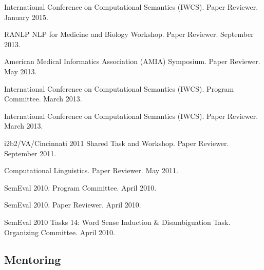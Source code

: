 \documentclass[letterpaper]{article}
\renewenvironment{itemize}{
  \begin{list}{}{
    \setlength{\leftmargin}{1.5em}
  }
}{
  \end{list}
}
\begin{document}
\begin{itemize}
\item International Conference on Computational Semantics (IWCS). Paper Reviewer. January 2015.
\item RANLP NLP for Medicine and Biology Workshop. Paper Reviewer. September 2013.
\item American Medical Informatics Association (AMIA) Symposium. Paper Reviewer. May 2013.
\item International Conference on Computational Semantics (IWCS). Program Committee. March 2013.
\item International Conference on Computational Semantics (IWCS). Paper Reviewer. March 2013.
\item i2b2/VA/Cincinnati 2011 Shared Task and Workshop. Paper Reviewer. September 2011.
\item Computational Linguistics. Paper Reviewer. May 2011.
\item SemEval 2010. Program Committee. April 2010.
\item SemEval 2010. Paper Reviewer. April 2010.
\item SemEval 2010 Tasks 14: Word Sense Induction \& Disambiguation Task. Organizing Committee. April 2010.
\end{itemize}

\subsection*{Mentoring}
\end{document}
